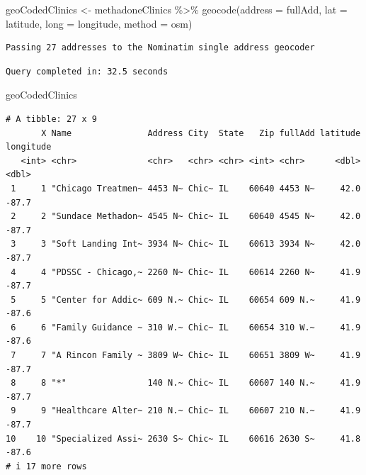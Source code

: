 \documentclass[
  letterpaper,
  DIV=11,
  numbers=noendperiod]{scrreprt}
\newenvironment{Shaded}{\begin{snugshade}}{\end{snugshade}}
\newcommand{\AttributeTok}[1]{\textcolor[rgb]{0.40,0.45,0.13}{#1}}
\newcommand{\FunctionTok}[1]{\textcolor[rgb]{0.28,0.35,0.67}{#1}}
\newcommand{\NormalTok}[1]{\textcolor[rgb]{0.00,0.23,0.31}{#1}}
\newcommand{\OtherTok}[1]{\textcolor[rgb]{0.00,0.23,0.31}{#1}}
\newcommand{\SpecialCharTok}[1]{\textcolor[rgb]{0.37,0.37,0.37}{#1}}
\newcommand{\StringTok}[1]{\textcolor[rgb]{0.13,0.47,0.30}{#1}}
\begin{document}
\begin{Shaded}
\begin{Highlighting}[]
\NormalTok{geoCodedClinics }\OtherTok{\textless{}{-}}\NormalTok{ methadoneClinics }\SpecialCharTok{\%\textgreater{}\%} 
                            \FunctionTok{geocode}\NormalTok{(}\AttributeTok{address =} \StringTok{\textquotesingle{}fullAdd\textquotesingle{}}\NormalTok{, }
                                    \AttributeTok{lat =}\NormalTok{ latitude, }
                                    \AttributeTok{long =}\NormalTok{ longitude, }
                                    \AttributeTok{method =} \StringTok{\textquotesingle{}osm\textquotesingle{}}\NormalTok{)}
\end{Highlighting}
\end{Shaded}

\begin{verbatim}
Passing 27 addresses to the Nominatim single address geocoder
\end{verbatim}

\begin{verbatim}
Query completed in: 32.5 seconds
\end{verbatim}

\begin{Shaded}
\begin{Highlighting}[]
\NormalTok{geoCodedClinics}
\end{Highlighting}
\end{Shaded}

\begin{verbatim}
# A tibble: 27 x 9
       X Name               Address City  State   Zip fullAdd latitude longitude
   <int> <chr>              <chr>   <chr> <chr> <int> <chr>      <dbl>     <dbl>
 1     1 "Chicago Treatmen~ 4453 N~ Chic~ IL    60640 4453 N~     42.0     -87.7
 2     2 "Sundace Methadon~ 4545 N~ Chic~ IL    60640 4545 N~     42.0     -87.7
 3     3 "Soft Landing Int~ 3934 N~ Chic~ IL    60613 3934 N~     42.0     -87.7
 4     4 "PDSSC - Chicago,~ 2260 N~ Chic~ IL    60614 2260 N~     41.9     -87.7
 5     5 "Center for Addic~ 609 N.~ Chic~ IL    60654 609 N.~     41.9     -87.6
 6     6 "Family Guidance ~ 310 W.~ Chic~ IL    60654 310 W.~     41.9     -87.6
 7     7 "A Rincon Family ~ 3809 W~ Chic~ IL    60651 3809 W~     41.9     -87.7
 8     8 "*"                140 N.~ Chic~ IL    60607 140 N.~     41.9     -87.7
 9     9 "Healthcare Alter~ 210 N.~ Chic~ IL    60607 210 N.~     41.9     -87.7
10    10 "Specialized Assi~ 2630 S~ Chic~ IL    60616 2630 S~     41.8     -87.6
# i 17 more rows
\end{verbatim}
\end{document}
